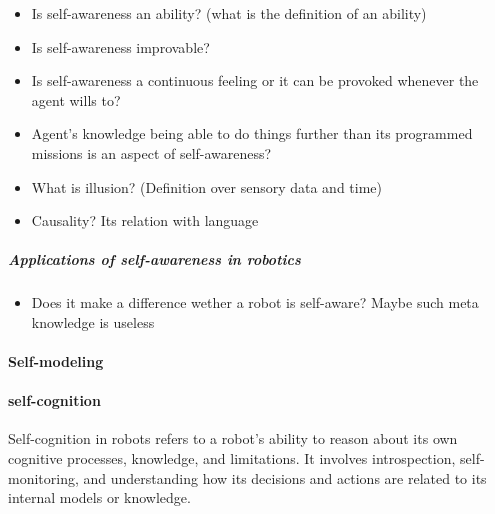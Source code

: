 \documentclass{book}
\begin{document}
\begin{itemize}
    \item Is self-awareness an ability? (what is the definition of an ability)
    \item Is self-awareness improvable?
    \item Is self-awareness a continuous feeling or it can be provoked whenever the agent wills to?
    \item Agent's knowledge being able to do things further than its programmed missions is an aspect of self-awareness?
    \item What is illusion? (Definition over sensory data and time)
    \item Causality? Its relation with language
\end{itemize}

\subparagraph{Applications of self-awareness in robotics}
\begin{itemize}
    \item Does it make a difference wether a robot is self-aware? Maybe such meta knowledge is useless
\end{itemize}


\paragraph{Self-modeling}


\paragraph{self-cognition}
Self-cognition in robots refers to a robot's ability to reason about its own cognitive processes, knowledge, and limitations. It involves introspection, self-monitoring, and understanding how its decisions and actions are related to its internal models or knowledge.
\end{document}
